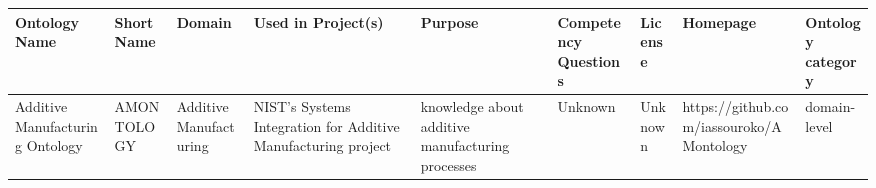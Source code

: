 \begin{tabular}{m{5cm}m{2cm}m{5cm}m{2cm}m{2cm}m{2cm}m{2cm}m{2cm}m{2cm}}
\toprule
                                                                    Ontology Name &              Short Name &                                      Domain &                                                                                                                                                                                                                                                                                                                                                   Used in Project(s) &                                                                                                                                                                                                                                                                                                                                                                                                Purpose &                                                                                               Competency Questions &                                      License &                                                                                           Homepage & Ontology category \\
\midrule
                                                  Additive Manufacturing Ontology &              AMONTOLOGY &                      Additive Manufacturing &                                                                                                                                                                                                                                                                                                       NIST's Systems Integration  for Additive Manufacturing project &                                                                                                                                                                                                                                                                                                                                                       knowledge about additive manufacturing processes &                                                                                                            Unknown &                                      Unknown &                                                           https://github.com/iassouroko/AMontology &      domain-level \\

\end{tabular}
